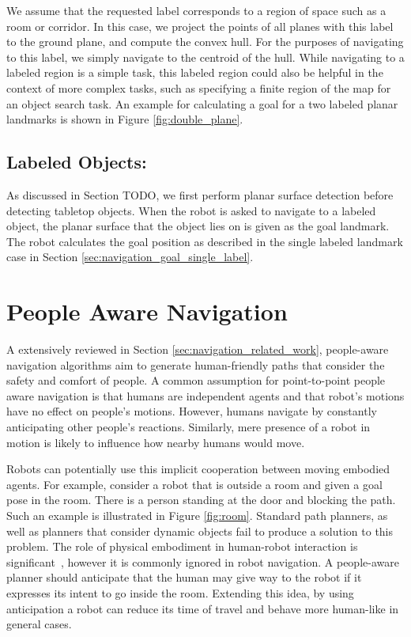 We assume that the requested label corresponds to a region of space such as a room or corridor. In this case, we project the points of all planes with this label to the ground plane, and compute the convex hull. For the purposes of navigating to this label, we simply navigate to the centroid of the hull. While navigating to a labeled region is a simple task, this labeled region could also be helpful in the context of more complex tasks, such as specifying a finite region of the map for an object search task. An example for calculating a goal for a two labeled planar landmarks is shown in Figure \ref{fig:double_plane}. 


\subsection{Labeled Objects:} As discussed in Section TODO, we first perform planar surface detection before detecting tabletop objects. When the robot is asked to navigate to a labeled object, the planar surface that the object lies on is given as the goal landmark. The robot calculates the goal position as described in the single labeled landmark case in Section \ref{sec:navigation_goal_single_label}.

\section{People Aware Navigation}
\label{sec:navigation_people_aware_navigation}

A extensively reviewed in Section \ref{sec:navigation_related_work}, people-aware navigation algorithms aim to generate human-friendly paths that consider the safety and comfort of people. A common assumption for point-to-point people aware navigation is that humans are independent agents and that robot's motions have no effect on people's motions. However, humans navigate by constantly anticipating other people's reactions. Similarly, mere presence of a robot in motion is likely to influence how nearby humans would move. 

Robots can potentially use this implicit cooperation between moving embodied agents. For example, consider a robot that is outside a room and given a goal pose in the room. There is a person standing at the door and blocking the path. Such an example is illustrated in Figure \ref{fig:room}. Standard path planners, as well as planners that consider dynamic objects fail to produce a solution to this problem. The role of physical embodiment in human-robot interaction is significant~\cite{wainer2006role}, however it is commonly ignored in robot navigation. A people-aware planner should anticipate that the human may give way to the robot if it expresses its intent to go inside the room. Extending this idea, by using anticipation a robot can reduce its time of travel and behave more human-like in general cases.

